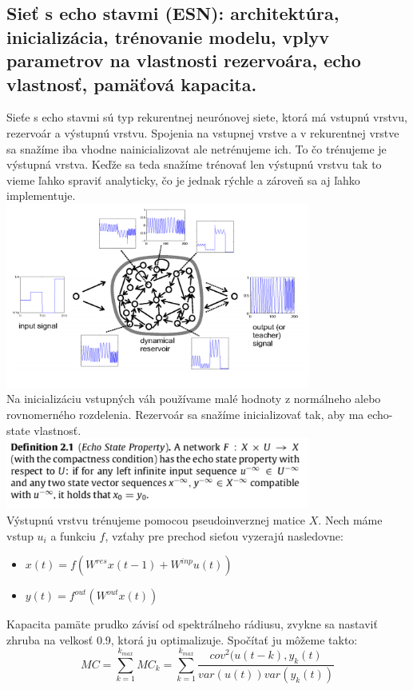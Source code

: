 \documentclass{article}
\numberwithin{equation}{section} %
\begin{document}
\subsection{Sieť s echo stavmi (ESN): architektúra, inicializácia, trénovanie modelu, vplyv parametrov na vlastnosti rezervoára, echo vlastnosť, pamäťová kapacita.}
Sieťe s echo stavmi sú typ rekurentnej neurónovej siete, ktorá má vstupnú vrstvu, rezervoár a výstupnú vrstvu.
Spojenia na vstupnej vrstve a v rekurentnej vrstve sa snažíme iba vhodne nainicializovat ale netrénujeme ich. To čo trénujeme je výstupná vrstva. Keďže sa teda snažíme trénovať len výstupnú vrstvu tak to vieme ľahko spraviť analyticky, čo je jednak rýchle a zároveň sa aj ľahko implementuje.\\
\includegraphics[width=10cm]{imgs/esn}\\
Na inicializáciu vstupných váh používame malé hodnoty z normálneho alebo rovnomerného rozdelenia. Rezervoár sa snažíme inicializovať tak, aby ma echo-state vlastnosť. \\
\includegraphics[width=10cm]{imgs/echo_prop}\\
Výstupnú vrstvu trénujeme pomocou pseudoinverznej matice $X$. 
Nech máme vstup $u_i$ a funkciu $f$, vzťahy pre prechod sieťou vyzerajú nasledovne: 
\begin{itemize}
\item $x(t) = f(W^{res}x(t-1) + W^{inp}u(t))$
\item $y(t) = f^{out}(W^{out}x(t))$
\end{itemize}
Kapacita pamäte prudko závisí od spektrálneho rádiusu, zvykne sa nastaviť zhruba na velkosť 0.9, ktorá ju optimalizuje. Spočítať ju môžeme takto:
$$MC = \sum_{k=1}^{k_{max}}MC_k = \sum_{k=1}^{k_{max}}\frac{cov^2(u(t-k),y_k(t)}{var(u(t)) var(y_k(t))}$$
\end{document}

